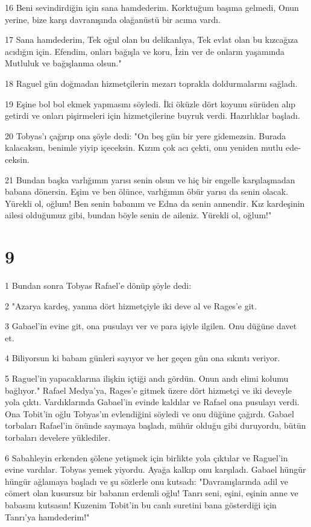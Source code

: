 \par 16 Beni sevindirdiğin için sana hamdederim. Korktuğum başıma gelmedi, Onun yerine, bize karşı davranışında olağanüstü bir acıma vardı.
\par 17 Sana hamdederim, Tek oğul olan bu delikanlıya, Tek evlat olan bu kızcağıza acıdığın için. Efendim, onları bağışla ve koru, İzin ver de onların yaşamında Mutluluk ve bağışlanma olsun."
\par 18 Raguel gün doğmadan hizmetçi­lerin mezarı toprakla doldurmalarını sağladı.
\par 19 Eşine bol bol ekmek yap­masını söyledi. İki öküzle dört koyu­nu sürüden alıp getirdi ve onları pişirmeleri için hizmetçilerine buyruk verdi. Hazırlıklar başladı.
\par 20 Tobyas'ı çağırıp ona şöyle dedi: "On beş gün bir yere gidemezsin. Burada kalacak­sın, benimle yiyip içeceksin. Kızım çok acı çekti, onu yeniden mutlu ede­ceksin.
\par 21 Bundan başka varlığımın ya­rısı senin olsun ve hiç bir engelle karşılaşmadan babana dönersin. Eşim ve ben ölünce, varlığımın öbür yarısı da senin olacak. Yürekli ol, oğlum! Ben senin babanım ve Edna da senin annendir. Kız kardeşinin ailesi oldu­ğumuz gibi, bundan böyle senin de aileniz. Yürekli ol, oğlum!"

\chapter{9}

\par 1 Bundan sonra Tobyas Rafael'e dönüp şöyle dedi:
\par 2 "Azarya kar­deş, yanına dört hizmetçiyle iki deve al ve Rages'e git.
\par 3 Gabael'in evine git, ona pusulayı ver ve para işiyle ilgilen. Onu düğüne davet et.
\par 4 Bili­yorsun ki babam günleri sayıyor ve her geçen gün ona sıkıntı veriyor.
\par 5 Raguel'in yapacaklarına ilişkin içtiği andı gördün. Onun andı elimi kolumu bağlıyor." Rafael Medya'ya, Rages'e gitmek üzere dört hizmetçi ve iki deveyle yola çıktı. Vardıklarında Gabael'in evinde kaldılar ve Rafael ona pu­sulayı verdi. Ona Tobit'in oğlu Tob­yas'ın evlendiğini söyledi ve onu düğüne çağırdı. Gabael torbaları Rafa­el'in önünde saymaya başladı, mühür olduğu gibi duruyordu, bütün torba­ları develere yüklediler.
\par 6 Sabahleyin erkenden şölene yetişmek için birlikte yola çıktılar ve Raguel'in evine vardı­lar. Tobyas yemek yiyordu. Ayağa kalkıp onu karşıladı. Gabael hüngür hüngür ağlamaya başladı ve şu sözler­le onu kutsadı: "Davranışlarında adil ve cömert olan kusursuz bir babanın erdemli oğlu! Tanrı seni, eşini, eşinin anne ve babasını kutsasın! Kuzenim Tobit'in bu canlı suretini bana göster­diği için Tanrı'ya hamdederim!"

